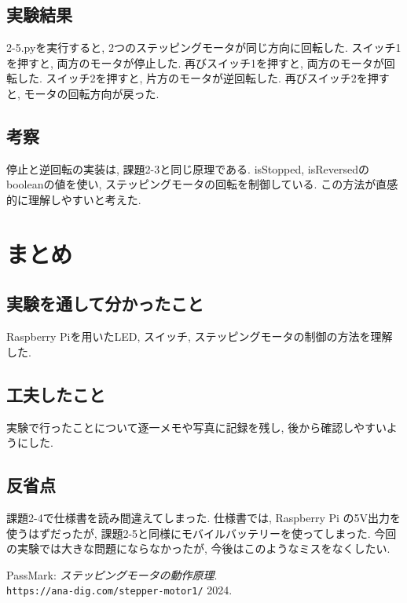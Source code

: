 \documentclass{ltjsarticle} %
\begin{document}
\subsection{実験結果}
2-5.pyを実行すると, 2つのステッピングモータが同じ方向に回転した. 
スイッチ1を押すと, 両方のモータが停止した. 再びスイッチ1を押すと, 両方のモータが回転した. 
スイッチ2を押すと, 片方のモータが逆回転した. 再びスイッチ2を押すと, モータの回転方向が戻った. 


\subsection{考察}
停止と逆回転の実装は, 課題2-3と同じ原理である. isStopped, isReversedのbooleanの値を使い, 
ステッピングモータの回転を制御している. この方法が直感的に理解しやすいと考えた.  


\section{まとめ}

\subsection{実験を通して分かったこと}
Raspberry Piを用いたLED, スイッチ, ステッピングモータの制御の方法を理解した. 

\subsection{工夫したこと}
実験で行ったことについて逐一メモや写真に記録を残し, 後から確認しやすいようにした.

\subsection{反省点}
課題2-4で仕様書を読み間違えてしまった. 仕様書では, Raspberry Pi の5V出力を使うはずだったが, 
課題2-5と同様にモバイルバッテリーを使ってしまった. 今回の実験では大きな問題にならなかったが, 
今後はこのようなミスをなくしたい. 


\begin{thebibliography}{99} %
    
  PassMark: 
  \emph{ステッピングモータの動作原理}. \\
  \verb|https://ana-dig.com/stepper-motor1/|  2024.

\end{thebibliography}
\end{document}
